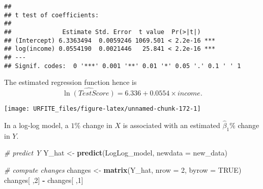 \documentclass[]{book}
\newenvironment{Shaded}{\begin{snugshade}}{\end{snugshade}}
\newcommand{\KeywordTok}[1]{\textcolor[rgb]{0.13,0.29,0.53}{\textbf{#1}}}
\newcommand{\DataTypeTok}[1]{\textcolor[rgb]{0.13,0.29,0.53}{#1}}
\newcommand{\DecValTok}[1]{\textcolor[rgb]{0.00,0.00,0.81}{#1}}
\newcommand{\StringTok}[1]{\textcolor[rgb]{0.31,0.60,0.02}{#1}}
\newcommand{\CommentTok}[1]{\textcolor[rgb]{0.56,0.35,0.01}{\textit{#1}}}
\newcommand{\OtherTok}[1]{\textcolor[rgb]{0.56,0.35,0.01}{#1}}
\newcommand{\OperatorTok}[1]{\textcolor[rgb]{0.81,0.36,0.00}{\textbf{#1}}}
\newcommand{\NormalTok}[1]{#1}
\theoremstyle{definition}
\theoremstyle{definition}
\theoremstyle{definition}
\theoremstyle{remark}
\begin{document}
\begin{verbatim}
## 
## t test of coefficients:
## 
##              Estimate Std. Error  t value  Pr(>|t|)    
## (Intercept) 6.3363494  0.0059246 1069.501 < 2.2e-16 ***
## log(income) 0.0554190  0.0021446   25.841 < 2.2e-16 ***
## ---
## Signif. codes:  0 '***' 0.001 '**' 0.01 '*' 0.05 '.' 0.1 ' ' 1
\end{verbatim}

The estimated regression function hence is
\[\widehat{\ln(TestScore)} = 6.336 + 0.0554 \times income.\]

\begin{Shaded}
\end{Shaded}

\begin{center}\texttt{[image: URFITE\_files/figure-latex/unnamed-chunk-172-1]} \end{center}

In a log-log model, a \(1\%\) change in \(X\) is associated with an
estimated \(\hat\beta_1 \%\) change in \(Y\).

\begin{Shaded}
\begin{Highlighting}[]
\CommentTok{# predict Y}
\NormalTok{Y_hat <-}\StringTok{ }\KeywordTok{predict}\NormalTok{(LogLog_model, }\DataTypeTok{newdata =}\NormalTok{ new_data)}

\CommentTok{# compute changes}
\NormalTok{changes <-}\StringTok{ }\KeywordTok{matrix}\NormalTok{(Y_hat, }\DataTypeTok{nrow =} \DecValTok{2}\NormalTok{, }\DataTypeTok{byrow =} \OtherTok{TRUE}\NormalTok{)}
\NormalTok{changes[ ,}\DecValTok{2}\NormalTok{] }\OperatorTok{-}\StringTok{ }\NormalTok{changes[ ,}\DecValTok{1}\NormalTok{]}
\end{Highlighting}
\end{Shaded}
\end{document}
